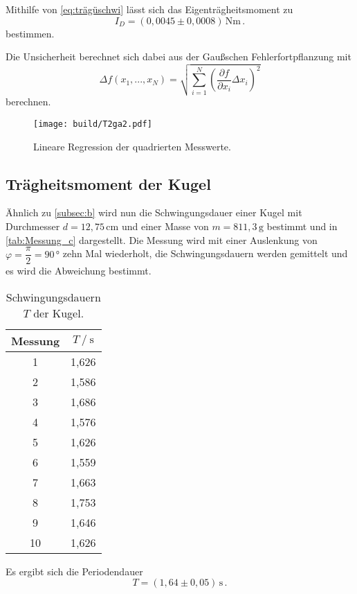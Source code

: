 Mithilfe von \eqref{eq:trägüschwi} lässt sich das Eigenträgheitsmoment zu
\begin{equation*}
  I_D = (0,0045 \pm 0,0008) \,\unit{\newton\meter} \,.
\end{equation*}
bestimmen.

Die Unsicherheit berechnet sich dabei aus der Gaußschen Fehlerfortpflanzung mit
\begin{equation}
  Δf(x_1,...,x_N) = \sqrt{\sum_{i=1}^N \left(\frac{\partial f}{\partial x_i}Δx_i\right)^2}
  \label{eq:gaußfehler}
\end{equation}
berechnen.

\begin{figure}[H]
  \centering
  \texttt{[image: build/T2ga2.pdf]}
  \caption{Lineare Regression der quadrierten Messwerte.}
  \label{fig:T2ga2}
\end{figure}

\subsection{Trägheitsmoment der Kugel}
\label{subsec:c}

Ähnlich zu \autoref{subsec:b} wird nun die Schwingungsdauer einer Kugel mit Durchmesser $d = 12,75 \, \unit{\centi\meter}$ und einer Masse von $m = 811,3 \,\unit{\gram}$ bestimmt und in \autoref{tab:Messung_c} dargestellt.
Die Messung wird mit einer Auslenkung von $\varphi = \dfrac{π}{2} = 90 \,\unit{\degree}$ zehn Mal wiederholt, die Schwingungsdauern werden gemittelt und es wird die Abweichung bestimmt.

\begin{table}[H] %
  \centering
  \begin{tabular}{S[table-format=2.0] S[table-format=1.2]}
      \toprule
      {Messung} & {$T \mathbin{/} \unit{\second}$}\\
        & 1,626 \\
          2  & 1,586 \\
          3  & 1,686 \\
          4  & 1,576 \\  
          5  & 1,626 \\
          6  & 1,559 \\
          7  & 1,663 \\
          8  & 1,753 \\
          9  & 1,646 \\
          10 & 1,626 \\
      \bottomrule
  \end{tabular}
  \caption{Schwingungsdauern $T$ der Kugel.}
  \label{tab:Messung_c}
\end{table}
Es ergibt sich die Periodendauer
\begin{equation*}
  T= (1,64 \pm 0,05) \, \unit{\second} \,.
\end{equation*}

